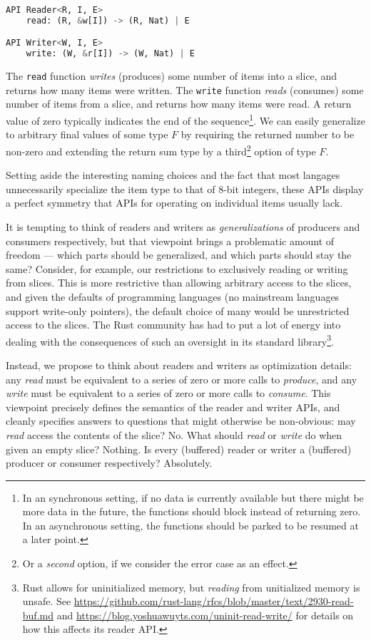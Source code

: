 \documentclass[sigplan,screen,10pt,anonymous,review]{acmart}
\begin{document}
\begin{lstlisting}[language=Python]
API Reader<R, I, E>
    read: (R, &w[I]) -> (R, Nat) | E

API Writer<W, I, E>
    write: (W, &r[I]) -> (W, Nat) | E
\end{lstlisting}

The \texttt{read} function \textit{writes} (produces) some number of items into a slice, and returns how many items were written. The \texttt{write} function \textit{reads} (consumes) some number of items from a slice, and returns how many items were read. A return value of zero typically indicates the end of the sequence\footnote{In an synchronous setting, if no data is currently available but there might be more data in the future, the functions should block instead of returning zero. In an asynchronous setting, the functions should be parked to be resumed at a later point.}. We can easily generalize to arbitrary final values of some type $F$ by requiring the returned number to be non-zero and extending the return sum type by a third\footnote{Or a \textit{second} option, if we consider the error case as an effect.} option of type $F$.

Setting aside the interesting naming choices and the fact that most langages unnecessarily specialize the item type to that of 8-bit integers, these APIs display a perfect symmetry that APIs for operating on individual items usually lack.

It is tempting to think of readers and writers as \textit{generalizations} of producers and consumers respectively, but that viewpoint brings a problematic amount of freedom --- which parts should be generalized, and which parts should stay the same? Consider, for example, our restrictions to exclusively reading or writing from slices. This is more restrictive than allowing arbitrary access to the slices, and given the defaults of programming languages (no mainstream languages support write-only pointers), the default choice of many would be unrestricted access to the slices. The Rust community has had to put a lot of energy into  dealing with the consequences of such an oversight in its standard library\footnote{Rust allows for uninitialized memory, but \textit{reading} from unitialized memory is unsafe. See \url{https://github.com/rust-lang/rfcs/blob/master/text/2930-read-buf.md} and \url{https://blog.yoshuawuyts.com/uninit-read-write/} for details on how this affects its reader API.}.

Instead, we propose to think about readers and writers as optimization details: any \textit{read} must be equivalent to a series of zero or more calls to \textit{produce}, and any \textit{write} must be equivalent to a series of zero or more calls to \textit{consume}. This viewpoint precisely defines the semantics of the reader and writer APIs, and cleanly specifies answers to questions that might otherwise be non-obvious: may \textit{read} access the contents of the slice? No. What should \textit{read} or \textit{write} do when given an empty slice? Nothing. Is every (buffered) reader or writer a (buffered) producer or consumer respectively? Absolutely.
\end{document}

